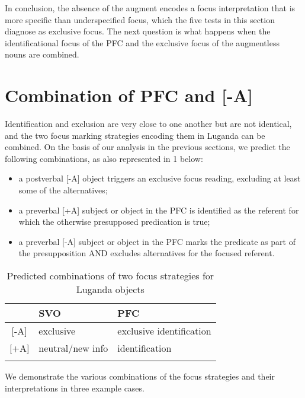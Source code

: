 \documentclass[output=paper]{langsci/langscibook}
\begin{document}
  In conclusion, the absence of the augment encodes a focus interpretation that is more specific than  underspecified focus, which the five tests in this section diagnose as exclusive focus. The next question is what happens when the identificational focus of the PFC and the exclusive focus of the augmentless nouns are combined.

\section{Combination of PFC and [-A]}\label{sec:vanderwal:5}
 
Identification and exclusion are very close to one another but are not identical, and the two focus marking strategies encoding them in Luganda can be combined. On the basis of our analysis in the previous sections, we predict the following combinations, as also represented in 1 below:

\begin{itemize}
 \item a postverbal [-A] object triggers an exclusive focus reading, excluding at least some of the alternatives;
 \item a preverbal [+A] subject or object in the PFC is identified as the referent for which the otherwise presupposed predication is true;
 \item a preverbal [-A] subject or object in the PFC marks the predicate as part of the presupposition AND excludes alternatives for the focused referent.
\end{itemize} 

\begin{table}
\caption{Predicted combinations of two focus strategies for Luganda objects}
\begin{tabular}{cll} 
\lsptoprule
& {{SVO}} & {{PFC}}\\ 
\midrule{}
[-A] & {\mdseries exclusive} & {\mdseries exclusive identification}\\{}
[+A] & {\mdseries neutral/new info} & {\mdseries identification}\\
\lspbottomrule
\end{tabular}
\end{table}

We demonstrate the various combinations of the focus strategies and their interpretations in three example cases.
\end{document}
